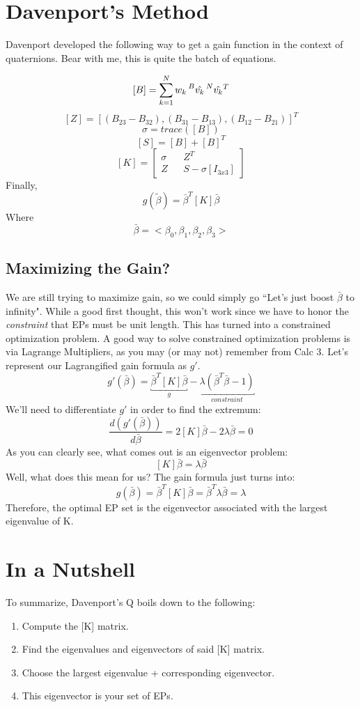 \documentclass[a4paper,14pt]{extreport}
\newcommand{\vk}[1]{\prescript{#1}{}{\hat{v_k}}}
\begin{document}
\section{Davenport's Method}
Davenport developed the following way to get a gain function in the context of quaternions. Bear with me, this is quite the batch of equations.

\[
[B] = \sum^N_{k=1} w_k\vk{B}\vk{N}^T
\]
\[
[Z] = [(B_{23}-B_{32}), (B_{31}-B_{13}), (B_{12}-B_{21})]^T
\]
\[
\sigma = trace([B])
\]
\[
[S] = [B]+[B]^T
\]
\[
[K] =
\begin{bmatrix}
\sigma && Z^T \\ Z && S-\sigma  [I_{3x3}]
\end{bmatrix}
\]
Finally,
\[
g(\tilde{\beta}) = \bar{\beta}^T[K]\bar{\beta}
\]
Where
\[\bar{\beta} = <\beta_0,\beta_1,\beta_2,\beta_3>\]
\subsection{Maximizing the Gain?}
We are still trying to maximize gain, so we could simply go ``Let's just boost $\bar{\beta}$ to infinity". While a good first thought, this won't work since we have to honor the \emph{constraint} that EPs must be unit length. This has turned into a constrained optimization problem. A good way to solve constrained optimization problems is via Lagrange Multipliers, as you may (or may not) remember from Calc 3. Let's represent our Lagrangified gain formula as $g'$.
\[
g'(\bar{\beta}) = \underbracket{\bar{\beta}^T[K]\bar{\beta}}_{g} - \underbracket{\lambda(\bar{\beta}^T\bar{\beta}-1)}_{constraint}
\]
We'll need to differentiate $g'$ in order to find the extremum:
\[
\dfrac{d(g'(\bar{\beta}))}{d\bar{\beta}} = 2[K]\bar{\beta} - 2\lambda\bar{\beta}=0
\]
As you can clearly see, what comes out is an eigenvector problem:
\[
[K]\bar{\beta}=\lambda\bar{\beta}
\]
Well, what does this mean for us? The gain formula just turns into:
\[
g(\bar{\beta}) = \bar{\beta}^T[K]\bar{\beta} = \bar{\beta}^T\lambda\bar{\beta} = \lambda
\]Therefore, the optimal EP set is the eigenvector associated with the largest eigenvalue of K.
\section{In a Nutshell}

To summarize, Davenport's Q boils down to the following:
\begin{enumerate}
\item{Compute the [K] matrix.}
\item{Find the eigenvalues and eigenvectors of said [K] matrix.}
\item{Choose the largest eigenvalue + corresponding eigenvector.}
\item{This eigenvector is your set of EPs.}
\end{enumerate}
\end{document}
